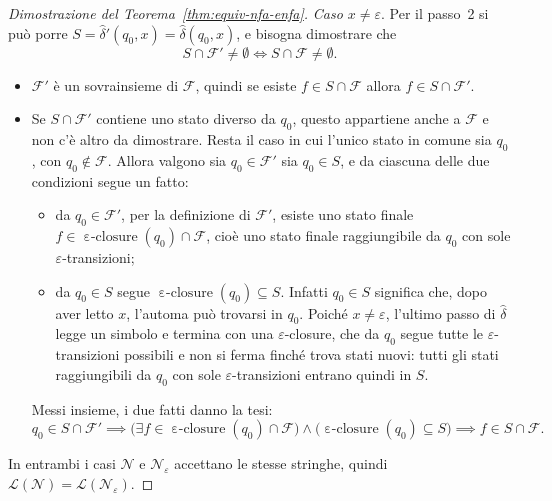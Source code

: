 \documentclass[a4paper, 11pt, oneside]{book}
\theoremstyle{formale}
\DeclareMathOperator{\eclosure}{\varepsilon\text{-}closure}
\begin{document}
\begin{proof}[Dimostrazione del Teorema~\ref{thm:equiv-nfa-enfa}]
        \textit{Caso $x \neq \varepsilon$}. Per il passo~2 si pu\`o porre
        $S = \hat{\delta}'(q_0, x) = \hat{\delta}(q_0, x)$, e bisogna dimostrare che
        \begin{equation*}
            S \cap \mathcal{F}' \neq \emptyset \iff S \cap \mathcal{F} \neq \emptyset.
        \end{equation*}
        \begin{itemize}[leftmargin=3em]
            \item[($\Leftarrow$)] $\mathcal{F}'$ \`e un sovrainsieme di $\mathcal{F}$,
                quindi se esiste $f \in S \cap \mathcal{F}$ allora
                $f \in S \cap \mathcal{F}'$.
            \item[($\Rightarrow$)] Se $S \cap \mathcal{F}'$ contiene uno stato diverso da
                $q_0$, questo appartiene anche a $\mathcal{F}$ e non c'\`e altro da
                dimostrare. Resta il caso in cui l'unico stato in comune sia $q_0$, con
                $q_0 \notin \mathcal{F}$. Allora valgono sia $q_0 \in \mathcal{F}'$ sia
                $q_0 \in S$, e da ciascuna delle due condizioni segue un fatto:
                \begin{itemize}
                    \item da $q_0 \in \mathcal{F}'$, per la definizione di
                        $\mathcal{F}'$, esiste uno stato finale
                        $f \in \eclosure(q_0) \cap \mathcal{F}$, cio\`e uno stato finale
                        raggiungibile da $q_0$ con sole $\varepsilon$-transizioni;
                    \item da $q_0 \in S$ segue $\eclosure(q_0) \subseteq S$. Infatti
                        $q_0 \in S$ significa che, dopo aver letto $x$, l'automa pu\`o
                        trovarsi in $q_0$. Poich\'e $x \neq \varepsilon$, l'ultimo passo
                        di $\hat{\delta}$ legge un simbolo e termina con una
                        $\varepsilon$-closure, che da $q_0$ segue tutte le
                        $\varepsilon$-transizioni possibili e non si ferma finch\'e trova
                        stati nuovi: tutti gli stati raggiungibili da $q_0$ con sole
                        $\varepsilon$-transizioni entrano quindi in $S$.
                \end{itemize}
                Messi insieme, i due fatti danno la tesi:
                \begin{equation*}
                    q_0 \in S \cap \mathcal{F}'
                    \implies
                    \bigl(\exists f \in \eclosure(q_0) \cap \mathcal{F}\bigr) \land
                    \bigl(\eclosure(q_0) \subseteq S\bigr)
                    \implies
                    f \in S \cap \mathcal{F}.
                \end{equation*}
        \end{itemize}
        In entrambi i casi $\mathcal{N}$ e $\mathcal{N}_\varepsilon$ accettano le stesse
        stringhe, quindi $\mathcal{L}(\mathcal{N}) = \mathcal{L}(\mathcal{N}_\varepsilon)$.


\end{proof}
\end{document}
